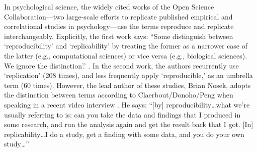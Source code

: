 \documentclass{statement}
\begin{document}
In psychological science, the widely cited works of the Open Science Collaboration---two large-scale efforts to replicate published empirical and correlational studies in psychology---use the terms reproduce and replicate interchangeably. 
Explicitly, the first work says: ``Some distinguish between `reproducibility' and `replicability' by treating the former as a narrower case of the latter (e.g., computational sciences) or vice versa (e.g., biological sciences). We ignore the distinction'.' \cite[]{openscience2012}. 
In the second work, the authors recurrently use `replication' (208 times), and less frequently apply `reproducible,' as an umbrella term (60 times). 
However, the lead author of these studies, Brian Nosek, adopts the distinction between terms according to Claerbout/Donoho/Peng when speaking in a recent video interview \cite[]{nsf2015vid}. 
He says:
``[by] reproducibility\ldots what we're usually referring to is: can you take the data and findings that I produced in some research, and run the analysis again and get the result back that I got.
[In] replicability\ldots I do a study, get a finding with some data, and you do your own study\ldots''







{\small


}



\end{document}
